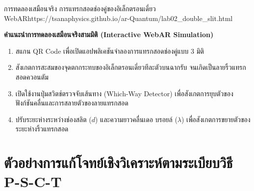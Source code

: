 \begin{qrcodelabbox}{การทดลองเสมือนจริง การแทรกสอดช่องคู่ของอิเล็กตรอนเดี่ยว WebAR}{https://tsanaphysics.github.io/ar-Quantum/lab02_double_slit.html}
\begin{minipage}[c]{0.70\textwidth}
\textbf{คำแนะนำการทดลองเสมือนจริงสามมิติ (Interactive WebAR Simulation)}
\begin{enumerate}
    \item สแกน QR Code เพื่อเปิดแอปพลิเคชันจำลองการแทรกสอดช่องคู่แบบ 3 มิติ
    \item สังเกตการสะสมของจุดตกกระทบของอิเล็กตรอนเดี่ยวทีละตัวบนฉากรับ จนเกิดเป็นลายริ้วแทรกสอดควอนตัม
    \item เปิดใช้งานปุ่มสวิตช์ตรวจจับเส้นทาง (Which-Way Detector) เพื่อสังเกตการยุบตัวของฟังก์ชันคลื่นและการสลายตัวของลายแทรกสอด
    \item ปรับระยะห่างระหว่างช่องสลิต ($d$) และความยาวคลื่นเดอ บรอยล์ ($\lambda$) เพื่อสังเกตการขยายตัวของระยะห่างริ้วแทรกสอด
\end{enumerate}
\end{minipage}
\hfill
\begin{minipage}[c]{0.25\textwidth}
\centering
{}
\end{minipage}
\end{qrcodelabbox}

\section{ตัวอย่างการแก้โจทย์เชิงวิเคราะห์ตามระเบียบวิธี P-S-C-T}

